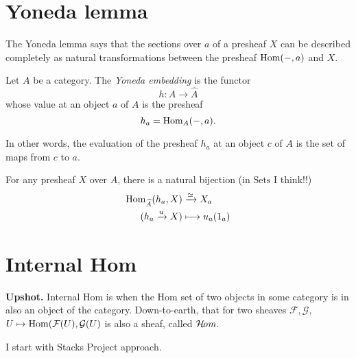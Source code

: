 \section{Yoneda lemma}
\label{section-Yoneda-lemma}

The Yoneda lemma says that the sections over $a$
of a presheaf $X$ can be described completely
as natural transformations between the 
presheaf $\mathop{\mathrm{Hom}}\nolimits(-,a)$ and $X$.

\begin{definition}
\label{definition-Yoneda-embedding}
\begin{reference}
\cite[Definition 1.1.3]{Cisinsky}
\end{reference}
Let $A$ be a category.
The {\it Yoneda embedding} is the functor
$$
h:A \to \hat{A}
$$
whose value at an object $a$ of $A$ is the presheaf
$$
h_a=\mathop{\mathrm{Hom}}\nolimits_A(-,a).
$$
\end{definition}

In other words, the evaluation of the presheaf
$h_a$ at an object $c$ of $A$ is the set of
maps from $c$ to $a$.

\begin{theorem}
\label{theorem-Yoneda-lemma}
\begin{reference}
\cite[Theorem 1.1.4]{Cisinsky}
\end{reference}
For any presheaf $X$ over $A$, there is a natural bijection
(in $\text{Sets}$ I think!!)
\begin{align*}
\mathop{\mathrm{Hom}}\nolimits_{\widehat{A}}(h_a,X) &\xrightarrow{\simeq} X_a  \\
(h_a \xrightarrow{u}X) &\longmapsto u_a(1_a)
\end{align*}

\end{theorem}

\section{Internal Hom}
\label{section-internal-hom}

\noindent
{\bf Upshot.} Internal Hom is when the
Hom set of two objects in some category
is in also an object of the category.
Down-to-earth, that for two sheaves $\mathcal{F},\mathcal{G}$,
$U\mapsto \mathop{\mathrm{Hom}}\nolimits(\mathcal{F}(U),\mathcal{G}(U)$ 
is also a sheaf, called $\mathop{\mathcal{H}\!\mathit{om}}\nolimits$.

\medskip\noindent
I start with Stacks Project approach.

